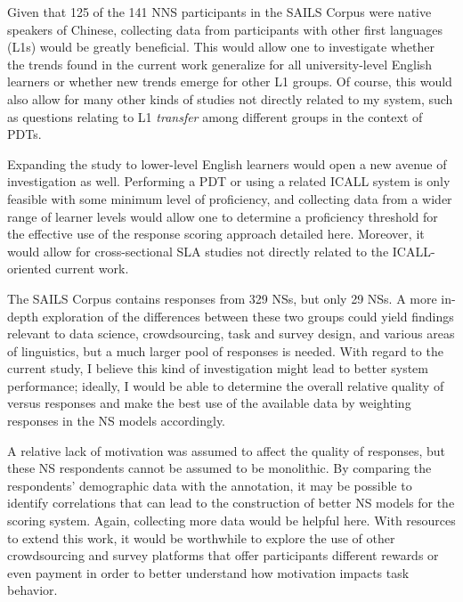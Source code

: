 Given that 125 of the 141 NNS participants in the SAILS Corpus were native speakers of Chinese, collecting data from participants with other first languages (L1s) would be greatly beneficial. This would allow one to investigate whether the trends found in the current work generalize for all university-level English learners or whether new trends emerge for other L1 groups. Of course, this would also allow for many other kinds of studies not directly related to my system, such as questions relating to L1 \textit{transfer} among different groups in the context of PDTs.

Expanding the study to lower-level English learners would open a new avenue of investigation as well. Performing a PDT or using a related ICALL system is only feasible with some minimum level of proficiency, and collecting data from a wider range of learner levels would allow one to determine a proficiency threshold for the effective use of the response scoring approach detailed here. Moreover, it would allow for cross-sectional SLA studies not directly related to the ICALL-oriented current work.

The SAILS Corpus contains responses from 329  NSs, but only 29  NSs. A more in-depth exploration of the differences between these two groups could yield findings relevant to data science, crowdsourcing, task and survey design, and various areas of linguistics, but a much larger pool of  responses is needed. With regard to the current study, I believe this kind of investigation might lead to better system performance; ideally, I would be able to determine the overall relative quality of  versus  responses and make the best use of the available data by weighting responses in the NS models accordingly.

A relative lack of motivation was assumed to affect the quality of  responses, but these NS respondents cannot be assumed to be monolithic. By comparing the respondents' demographic data with the annotation, it may be possible to identify correlations that can lead to the construction of better NS models for the scoring system. Again, collecting more data would be helpful here. With resources to extend this work, it would be worthwhile to explore the use of other crowdsourcing and survey platforms that offer participants different rewards or even payment in order to better understand how motivation impacts task behavior.

